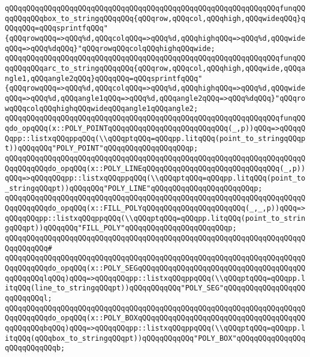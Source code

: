 \verb|qQQqqQQqqQQqqQQqqQQqqQQqqQQqqQQqqQQqqQQqqQQqqQQqqQQqqQQqqQQqqQQqfunqQQqqQQqqQQqbox_to_stringqQQqqQQq{qQQqrow,qQQqcol,qQQqhigh,qQQqwideqQQq}qQQqqQQq=qQQqsprintfqQQq"{qQQqrowqQQq=>qQQq%d,qQQqcolqQQq=>qQQq%d,qQQqhighqQQq=>qQQq%d,qQQqwideqQQq=>qQQq%dqQQq}"qQQqrowqQQqcolqQQqhighqQQqwide;|\newline
\verb|qQQqqQQqqQQqqQQqqQQqqQQqqQQqqQQqqQQqqQQqqQQqqQQqqQQqqQQqqQQqqQQqfunqQQqqQQqqQQqarc_to_stringqQQqqQQq{qQQqrow,qQQqcol,qQQqhigh,qQQqwide,qQQqangle1,qQQqangle2qQQq}qQQqqQQq=qQQqsprintfqQQq"{qQQqrowqQQq=>qQQq%d,qQQqcolqQQq=>qQQq%d,qQQqhighqQQq=>qQQq%d,qQQqwideqQQq=>qQQq%d,qQQqangle1qQQq=>qQQq%d,qQQqangle2qQQq=>qQQq%dqQQq}"qQQqrowqQQqcolqQQqhighqQQqwideqQQqangle1qQQqangle2;|\newline
\newline
\verb|qQQqqQQqqQQqqQQqqQQqqQQqqQQqqQQqqQQqqQQqqQQqqQQqqQQqqQQqqQQqqQQqfunqQQqdo_opqQQq(x::POLY_POINTqQQqqQQqqQQqqQQqqQQqqQQqqQQq(_,p))qQQq=>qQQqqQQqpp::listxqQQqppqQQq(\\qQQqptqQQq=qQQqpp.litqQQq(point_to_stringqQQqpt))qQQqqQQq"POLY_POINT"qQQqqQQqqQQqqQQqqQQqp;|\newline
\verb|qQQqqQQqqQQqqQQqqQQqqQQqqQQqqQQqqQQqqQQqqQQqqQQqqQQqqQQqqQQqqQQqqQQqqQQqqQQqqQQqdo_opqQQq(x::POLY_LINEqQQqqQQqqQQqqQQqqQQqqQQqqQQqqQQq(_,p))qQQq=>qQQqqQQqpp::listxqQQqppqQQq(\\qQQqptqQQq=qQQqpp.litqQQq(point_to_stringqQQqpt))qQQqqQQq"POLY_LINE"qQQqqQQqqQQqqQQqqQQqqQQqp;|\newline
\verb|qQQqqQQqqQQqqQQqqQQqqQQqqQQqqQQqqQQqqQQqqQQqqQQqqQQqqQQqqQQqqQQqqQQqqQQqqQQqqQQqdo_opqQQq(x::FILL_POLYqQQqqQQqqQQqqQQqqQQqqQQq(_,_,p))qQQq=>qQQqqQQqpp::listxqQQqppqQQq(\\qQQqptqQQq=qQQqpp.litqQQq(point_to_stringqQQqpt))qQQqqQQq"FILL_POLY"qQQqqQQqqQQqqQQqqQQqqQQqp;|\newline
\verb|qQQqqQQqqQQqqQQqqQQqqQQqqQQqqQQqqQQqqQQqqQQqqQQqqQQqqQQqqQQqqQQqqQQqqQQqqQQqqQQq#|\newline
\verb|qQQqqQQqqQQqqQQqqQQqqQQqqQQqqQQqqQQqqQQqqQQqqQQqqQQqqQQqqQQqqQQqqQQqqQQqqQQqqQQqdo_opqQQq(x::POLY_SEGqQQqqQQqqQQqqQQqqQQqqQQqqQQqqQQqqQQqqQQqqQQqqQQqlqQQq)qQQq=>qQQqqQQqpp::listxqQQqppqQQq(\\qQQqptqQQq=qQQqpp.litqQQq(line_to_stringqQQqpt))qQQqqQQqqQQq"POLY_SEG"qQQqqQQqqQQqqQQqqQQqqQQqqQQql;|\newline
\verb|qQQqqQQqqQQqqQQqqQQqqQQqqQQqqQQqqQQqqQQqqQQqqQQqqQQqqQQqqQQqqQQqqQQqqQQqqQQqqQQqdo_opqQQq(x::POLY_BOXqQQqqQQqqQQqqQQqqQQqqQQqqQQqqQQqqQQqqQQqqQQqqQQqbqQQq)qQQq=>qQQqqQQqpp::listxqQQqppqQQq(\\qQQqptqQQq=qQQqpp.litqQQq(qQQqbox_to_stringqQQqpt))qQQqqQQqqQQq"POLY_BOX"qQQqqQQqqQQqqQQqqQQqqQQqqQQqb;|\newline
